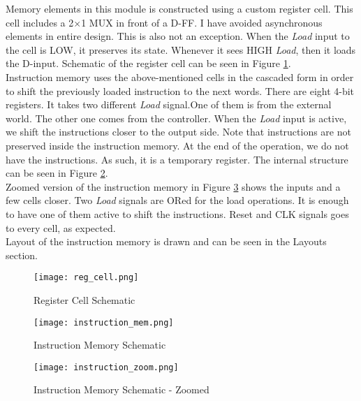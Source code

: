 \documentclass[12pt]{article}
\begin{document}
Memory elements in this module is constructed using a custom register cell. This cell includes a 2$\times$1 MUX in front of a D-FF. I have avoided asynchronous elements in entire design. This is also not an exception. When the \textsl{Load} input to the cell is LOW, it preserves its state. Whenever it sees HIGH \textsl{Load}, then it loads the D-input. Schematic of the register cell can be seen in Figure \ref{reg_cell_sch}. \\

Instruction memory uses the above-mentioned cells in the cascaded form in order to shift the previously loaded instruction to the next words. There are eight 4-bit registers. It takes two different \textsl{Load} signal.One of them is from the external world. The other one comes from the controller. When the \textsl{Load} input is active, we shift the instructions closer to the output side. Note that instructions are not preserved inside the instruction memory. At the end of the operation, we do not have the instructions. As such, it is a temporary register. The internal structure can be seen in Figure \ref{instruction_mem}. \\

Zoomed version of the instruction memory in Figure \ref{instruction_zoom} shows the inputs and a few cells closer. Two \textsl{Load} signals are ORed for the load operations. It is enough to have one of them active to shift the instructions. Reset and CLK signals goes to every cell, as expected.\\

Layout of the instruction memory is drawn and can be seen in the Layouts section.

\begin{figure}[H]
\centering
\texttt{[image: reg\_cell.png]}
\caption{Register Cell Schematic}
\label{reg_cell_sch}
\end{figure}



\begin{landscape}
\pagestyle{empty}
\begin{figure}[H]
\centering
\texttt{[image: instruction\_mem.png]}
\caption{Instruction Memory Schematic}
\label{instruction_mem}
\end{figure}


\begin{figure}[H]
\centering
\texttt{[image: instruction\_zoom.png]}
\caption{Instruction Memory Schematic -  Zoomed}
\label{instruction_zoom}
\end{figure}








\end{landscape}
\end{document}
